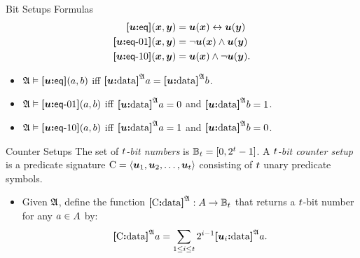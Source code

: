 \documentclass{beamer}
\begin{document}
\begin{frame}{Bit Setups Formulas}
\begin{align*}
  \feq\su(\xx,\yy) &= \su(\xx) \lequ \su(\yy) \\
  \feqOI\su(\xx,\yy) &= \lnot \su(\xx) \land \su(\yy) \\
  \feqIO\su(\xx,\yy) &= \su(\xx) \land \lnot \su(\yy). \\
\end{align*}
\begin{itemize}
  \item
  $\StrA\vDash\feq\su(\ea,\eb)$ iff $\data\su\StrA\ea = \data\su\StrA\eb$.
  
  \item
  $\StrA\vDash\feqOI\su(\ea,\eb)$ iff $\data\su\StrA\ea = 0$ and
  $\data\su\StrA\eb = 1$.
  
  \item
  $\StrA\vDash\feqIO\su(\ea,\eb)$ iff $\data\su\StrA\ea = 1$ and
  $\data\su\StrA\eb = 0$.
\end{itemize}
\end{frame}

\begin{frame}{Counter Setups}
The set of \emph{$\tbit$-bit numbers} is $\Bitnumst = [0, 2^\tbit-1]$.
A \emph{$\tbit$-bit counter setup} is a predicate signature $\CS =
\seq{\suu1,\suu2,\dots,\suu\tbit}$ consisting of $\tbit$ unary predicate
symbols.
\begin{itemize}
  \item
  Given $\StrA$, define the function $\data\CS\StrA : \domA \to \Bitnumst$ that
  returns a $\tbit$-bit number for any $\ea\in\domA$ by:
  \[
    \data\CS\StrA\ea = \sum_{1 \leq \ii \leq \tbit} 2^{\ii-1} 
    \data{\suu\ii}\StrA\ea.
  \]
\end{itemize}
\end{frame}
\end{document}
